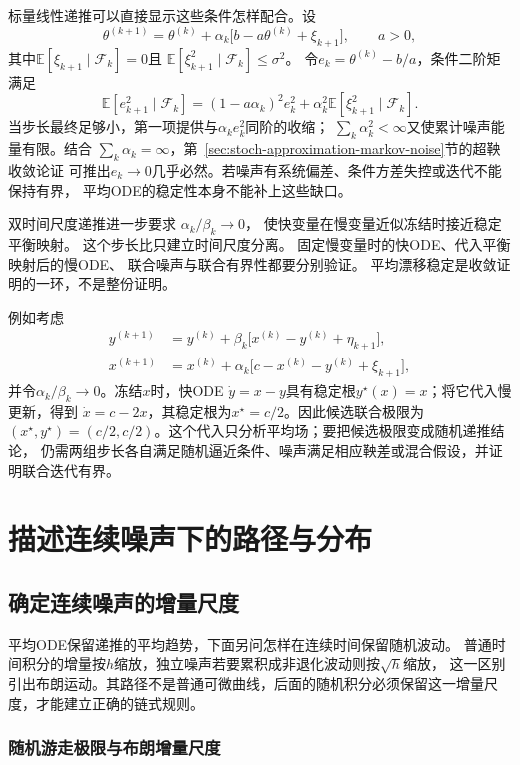 标量线性递推可以直接显示这些条件怎样配合。设
\[
	\theta^{(k+1)}
	=\theta^{(k)}+\alpha_k\bigl[b-a\theta^{(k)}+\xi_{k+1}\bigr],
	\qquad a>0,
\]
其中$\mathbb{E}[\xi_{k+1}\mid\mathcal{F}_k]=0$且
$\mathbb{E}[\xi_{k+1}^2\mid\mathcal{F}_k]\leq\sigma^2$。
令$e_k=\theta^{(k)}-b/a$，条件二阶矩满足
\[
	\mathbb{E}[e_{k+1}^2\mid\mathcal{F}_k]
	=(1-a\alpha_k)^2e_k^2
	+\alpha_k^2\mathbb{E}[\xi_{k+1}^2\mid\mathcal{F}_k].
\]
当步长最终足够小，第一项提供与$\alpha_k e_k^2$同阶的收缩；
$\sum_k\alpha_k^2<\infty$又使累计噪声能量有限。结合
$\sum_k\alpha_k=\infty$，第~\ref{sec:stoch-approximation-markov-noise}节的超鞅收敛论证
可推出$e_k\to0$几乎必然。若噪声有系统偏差、条件方差失控或迭代不能保持有界，
平均ODE的稳定性本身不能补上这些缺口。

双时间尺度递推进一步要求 $\alpha_{k}/\beta_{k}\to0$，
使快变量在慢变量近似冻结时接近稳定平衡映射。 这个步长比只建立时间尺度分离。
固定慢变量时的快ODE、代入平衡映射后的慢ODE、 联合噪声与联合有界性都要分别验证。
平均漂移稳定是收敛证明的一环，不是整份证明。

例如考虑
\begin{align*}
	y^{(k+1)}&=y^{(k)}+\beta_k\bigl[x^{(k)}-y^{(k)}+\eta_{k+1}\bigr],\\
	x^{(k+1)}&=x^{(k)}+\alpha_k\bigl[c-x^{(k)}-y^{(k)}+\xi_{k+1}\bigr],
\end{align*}
并令$\alpha_k/\beta_k\to0$。冻结$x$时，快ODE
$\dot y=x-y$具有稳定根$y^\star(x)=x$；将它代入慢更新，得到
$\dot x=c-2x$，其稳定根为$x^\star=c/2$。因此候选联合极限为
$(x^\star,y^\star)=(c/2,c/2)$。这个代入只分析平均场；要把候选极限变成随机递推结论，
仍需两组步长各自满足随机逼近条件、噪声满足相应鞅差或混合假设，并证明联合迭代有界。

\section{描述连续噪声下的路径与分布}
\label{sec:dynamical-ito-fokker-planck}

\subsection{确定连续噪声的增量尺度}
\label{sec:dynamical-brownian-motion}

平均ODE保留递推的平均趋势，下面另问怎样在连续时间保留随机波动。
普通时间积分的增量按$h$缩放，独立噪声若要累积成非退化波动则按$\sqrt h$缩放，
这一区别引出布朗运动。其路径不是普通可微曲线，后面的随机积分必须保留这一增量尺度，才能建立正确的链式规则。

\subsubsection{随机游走极限与布朗增量尺度}

